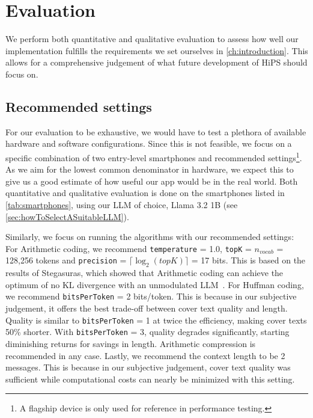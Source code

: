 
\chapter{Evaluation}\label{ch:evaluation}
\glsresetall %

We perform both quantitative and qualitative evaluation to assess how well our implementation fulfills the requirements we set ourselves in \cref{ch:introduction}. This allows for a comprehensive judgement of what future development of \gls{HiPS} should focus on.

\section{Recommended settings}
\label{sec:recommendedSettings}
For our evaluation to be exhaustive, we would have to test a plethora of available hardware and software configurations. Since this is not feasible, we focus on a specific combination of two entry-level smartphones and recommended settings\footnote{A flagship device is only used for reference in performance testing.}. As we aim for the lowest common denominator in hardware, we expect this to give us a good estimate of how useful our app would be in the real world. Both quantitative and qualitative evaluation is done on the smartphones listed in \cref{tab:smartphones}, using our \gls{LLM} of choice, Llama 3.2 1B (see \cref{sec:howToSelectASuitableLLM}).

Similarly, we focus on running the algorithms with our recommended settings: For Arithmetic coding, we recommend \lstinline|temperature| = 1.0, \lstinline|topK| = $ n_{vocab} $ = 128,256 tokens and \lstinline|precision| = $ \lceil \log_2(topK) \rceil $ = 17 bits. This is based on the results of Stegasuras, which showed that Arithmetic coding can achieve the optimum of no \gls{KL} divergence with an unmodulated \gls{LLM}~\cite{zieglerNeuralLinguisticSteganography2019}. For Huffman coding, we recommend \lstinline|bitsPerToken| = 2 bits/token. This is because in our subjective judgement, it offers the best trade-off between cover text quality and length. Quality is similar to \lstinline|bitsPerToken| = 1 at twice the efficiency, making cover texts 50\% shorter. With \lstinline|bitsPerToken| = 3, quality degrades significantly, starting diminishing returns for savings in length. Arithmetic compression is recommended in any case. Lastly, we recommend the context length to be 2 messages. This is because in our subjective judgement, cover text quality was sufficient while computational costs can nearly be minimized with this setting.


